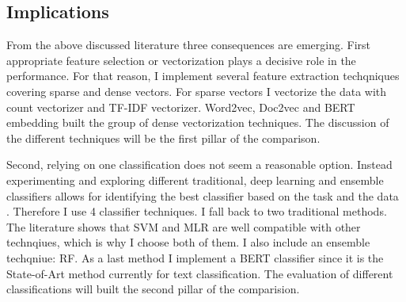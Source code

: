 \documentclass[12pt, a4paper, titlepage]{article}
\begin{document}





\subsection{Implications}
From the above discussed literature three consequences are emerging. First appropriate feature selection or vectorization plays a decisive role in the performance. For that reason, I implement several feature extraction techqniques covering sparse and dense vectors. For sparse vectors I vectorize the data with count vectorizer and \ac{TF-IDF} vectorizer. Word2vec, Doc2vec and BERT embedding built the group of dense vectorization techniques. The discussion of the different techniques will be the first pillar of the comparison. 

Second, relying on one classification does not seem a reasonable option.  Instead experimenting and exploring different traditional, deep learning and ensemble classifiers allows for identifying the best classifier based on the task and the data \citep{maglogiannis2007}. Therefore I use 4 classifier techniques. I fall back to two traditional methods. The literature shows that \ac{SVM} and \ac{MLR} are well compatible with other technqiues, which is why I choose both of them. I also include an ensemble techqniue: \ac{RF}. As a last method I implement a \ac{BERT} classifier since it is the State-of-Art method currently for text classification. The evaluation of different classifications will built the second pillar of the comparision. 
\end{document}
